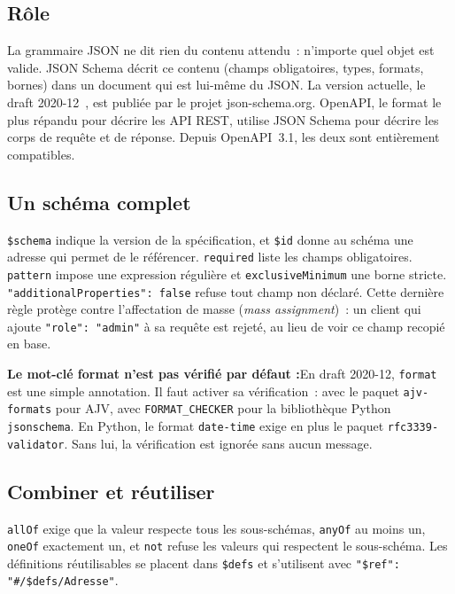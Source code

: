 \documentclass[12pt,a4paper]{article}
\newcommand{\warningbox}[2]{%
  \vspace{10pt}%
  \noindent\colorbox{accent!10}{%
    \parbox{\dimexpr\textwidth-2\fboxsep\relax}{%
      \vspace{4pt}\textbf{\color{accent}#1 :}\hspace{0.5em}\color{darkgray}#2\vspace{4pt}%
    }%
  }%
  \vspace{10pt}%
}
\newcommand{\exemple}[3][]{%
  \par\addvspace{6pt}\noindent\begin{minipage}{\linewidth}%
  \end{minipage}\par\addvspace{6pt}}
\begin{document}
\subsection{Rôle}
La grammaire JSON ne dit rien du contenu attendu~: n'importe quel objet est valide. JSON Schema décrit ce contenu (champs obligatoires, types, formats, bornes) dans un document qui est lui-même du JSON. La version actuelle, le draft 2020-12~\cite{jsonschema202012}, est publiée par le projet json-schema.org. OpenAPI, le format le plus répandu pour décrire les API REST, utilise JSON Schema pour décrire les corps de requête et de réponse. Depuis OpenAPI~3.1, les deux sont entièrement compatibles.

\subsection{Un schéma complet}
\exemple[language=json]{json/produit.schema.json}{Schéma d'un produit (draft 2020-12)}

\texttt{\$schema} indique la version de la spécification, et \texttt{\$id} donne au schéma une adresse qui permet de le référencer. \texttt{required} liste les champs obligatoires. \texttt{pattern} impose une expression régulière et \texttt{exclusiveMinimum} une borne stricte. \texttt{"additionalProperties": false} refuse tout champ non déclaré. Cette dernière règle protège contre l'affectation de masse (\textit{mass assignment})~: un client qui ajoute \texttt{"role": "admin"} à sa requête est rejeté, au lieu de voir ce champ recopié en base.

\warningbox{Le mot-clé format n'est pas vérifié par défaut}{En draft 2020-12, \texttt{format} est une simple annotation. Il faut activer sa vérification~: avec le paquet \texttt{ajv-formats} pour AJV, avec \texttt{FORMAT\_CHECKER} pour la bibliothèque Python \texttt{jsonschema}. En Python, le format \texttt{date-time} exige en plus le paquet \texttt{rfc3339-validator}. Sans lui, la vérification est ignorée sans aucun message.}

\subsection{Combiner et réutiliser}
\texttt{allOf} exige que la valeur respecte tous les sous-schémas, \texttt{anyOf} au moins un, \texttt{oneOf} exactement un, et \texttt{not} refuse les valeurs qui respectent le sous-schéma. Les définitions réutilisables se placent dans \texttt{\$defs} et s'utilisent avec \texttt{"\$ref": "\#/\$defs/Adresse"}.
\end{document}
